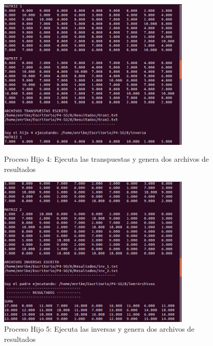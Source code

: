 \documentclass[12pt]{article}
\begin{document}
\begin{itemize}
\begin{figure}[h!]
                        
                      \includegraphics[width=0.82\textwidth]{Practica4/Images/Linux/8_5.png}
                        \caption{Proceso Hijo 4: Ejecuta las transpuestas y genera dos archivos de resultados}
                        
                        \includegraphics[width=0.82\textwidth]{Practica4/Images/Linux/8_6.png}
                        \caption{Proceso Hijo 5: Ejecuta las inversas y genera dos archivos de resultados}
                        
                    \end{figure}
                    \clearpage
                    \begin{figure}[h!]
                        \centering
                        

\end{figure}
\end{itemize}
\end{document}

